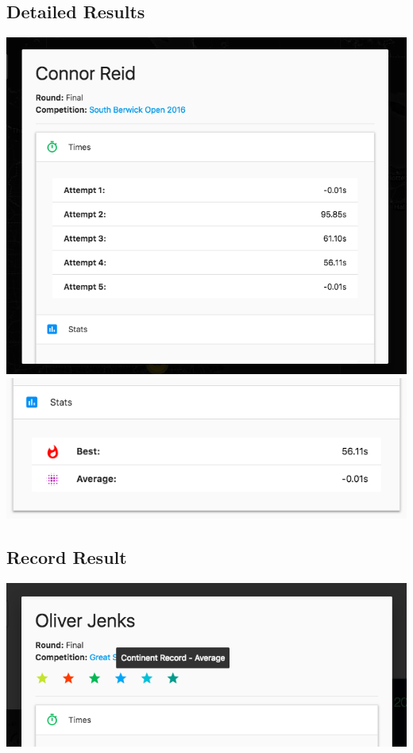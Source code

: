 \documentclass[12pt]{article}
\begin{document}
		\subsection{Detailed Results}
			\begin{center}
				\includegraphics[scale=0.45]{result_details_times.png}\\
				\vspace{5mm}
				\includegraphics[scale=0.53]{result_details_stats.png}\\
 			\end{center}

		\subsection{Record Result}
			\begin{center}
				\includegraphics[scale=0.47]{result_record.png}\\
 			\end{center}
\end{document}
